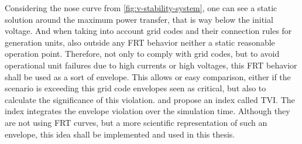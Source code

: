 Considering the nose curve from \autoref{fig:v-stability-system}, one can see a static solution around the maximum power transfer, that is way below the initial voltage.
And when taking into account grid codes and their connection rules for generation units, also outside any \ac{FRT} behavior neither a static reasonable operation point.
Therefore, not only to comply with grid codes, but to avoid operational unit failures due to high currents or high voltages, this \acs{FRT} behavior shall be used as a sort of envelope.
This allows or easy comparison, either if the scenario is exceeding this grid code envelopes seen as critical, but also to calculate the significance of this violation.
\textcite{scheiner_2022} and \textcite{wildenhues_2015} propose an index called \acf{TVI}.
The index integrates the envelope violation over the simulation time.
Although they are not using \acs{FRT} curves, but a more scientific representation of such an envelope, this idea shall be implemented and used in this thesis.

